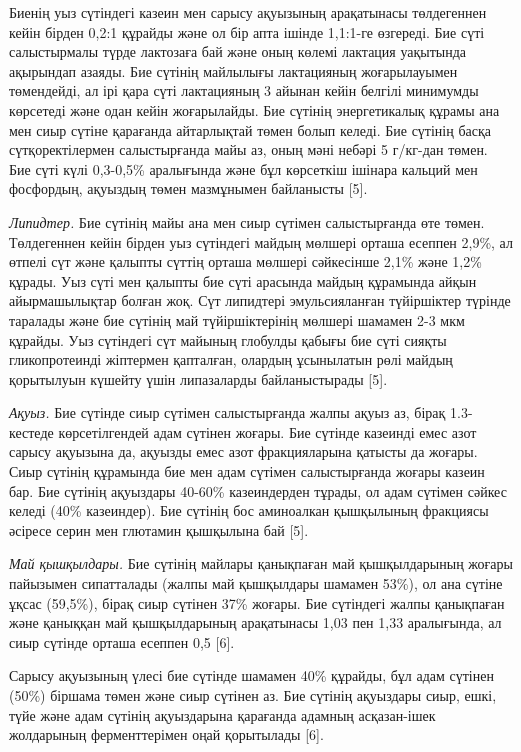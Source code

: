 \begin{multicols}{2}
Биенің уыз сүтіндегі казеин мен сарысу ақуызының арақатынасы төлдегеннен
кейін бірден 0,2:1 құрайды және ол бір апта ішінде 1,1:1-ге өзгереді.
Бие сүті салыстырмалы түрде лактозаға бай және оның көлемі лактация
уақытында ақырындап азаяды. Бие сүтінің майлылығы лактацияның
жоғарылауымен төмендейді, ал ірі қара сүті лактацияның 3 айынан кейін
белгілі минимумды көрсетеді және одан кейін жоғарылайды. Бие сүтінің
энергетикалық құрамы ана мен сиыр сүтіне қарағанда айтарлықтай төмен
болып келеді. Бие сүтінің басқа сүтқоректілермен салыстырғанда майы аз,
оның мәні небәрі 5 г/кг-дан төмен. Бие сүті күлі 0,3-0,5\% аралығында
және бұл көрсеткіш ішінара кальций мен фосфордың, ақуыздың төмен
мазмұнымен байланысты {[}5{]}.

\emph{Липидтер.} Бие сүтінің майы ана мен сиыр сүтімен салыстырғанда өте
төмен. Төлдегеннен кейін бірден уыз сүтіндегі майдың мөлшері орташа
есеппен 2,9\%, ал өтпелі сүт және қалыпты сүттің орташа мөлшері
сәйкесінше 2,1\% және 1,2\% құрады. Уыз сүті мен қалыпты бие сүті
арасында майдың құрамында айқын айырмашылықтар болған жоқ. Сүт липидтері
эмульсияланған түйіршіктер түрінде таралады және бие сүтінің май
түйіршіктерінің мөлшері шамамен 2-3 мкм құрайды. Уыз сүтіндегі сүт
майының глобулды қабығы бие сүті сияқты гликопротеинді жіптермен
қапталған, олардың ұсынылатын рөлі майдың қорытылуын күшейту үшін
липазаларды байланыстырады {[}5{]}.

\emph{Ақуыз.} Бие сүтінде сиыр сүтімен салыстырғанда жалпы ақуыз аз,
бірақ 1.3-кестеде көрсетілгендей адам сүтінен жоғары. Бие сүтінде
казеинді емес азот сарысу ақуызына да, ақуызды емес азот фракцияларына
қатысты да жоғары. Сиыр сүтінің құрамында бие мен адам сүтімен
салыстырғанда жоғары казеин бар. Бие сүтінің ақуыздары 40-60\%
казеиндерден тұрады, ол адам сүтімен сәйкес келеді (40\% казеиндер). Бие
сүтінің бос аминоалкан қышқылының фракциясы әсіресе серин мен глютамин
қышқылына бай {[}5{]}.

\emph{Май қышқылдары.} Бие сүтінің майлары қанықпаған май қышқылдарының
жоғары пайызымен сипатталады (жалпы май қышқылдары шамамен 53\%), ол ана
сүтіне ұқсас (59,5\%), бірақ сиыр сүтінен 37\% жоғары. Бие сүтіндегі
жалпы қанықпаған және қаныққан май қышқылдарының арақатынасы 1,03 пен
1,33 аралығында, ал сиыр сүтінде орташа есеппен 0,5 {[}6{]}.

Сарысу ақуызының үлесі бие сүтінде шамамен 40\% құрайды, бұл адам
сүтінен (50\%) біршама төмен және сиыр сүтінен аз. Бие сүтінің ақуыздары
сиыр, ешкі, түйе және адам сүтінің ақуыздарына қарағанда адамның
асқазан-ішек жолдарының ферменттерімен оңай қорытылады {[}6{]}.
\end{multicols}

